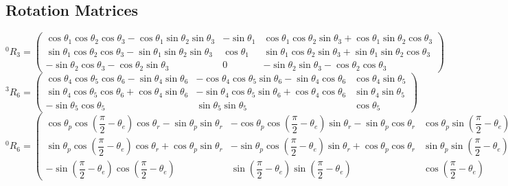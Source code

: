 \documentclass{article}
\begin{document}
\subsection{Rotation Matrices}
\bigskip
$
^{0}R_{3} = 
\begin{pmatrix}
	\cos\theta_{1} \cos\theta_{2} \cos\theta_{3} - \cos\theta_{1} \sin\theta_{2} \sin\theta_{3}
	& -\sin\theta_{1} &
	\cos\theta_{1} \cos\theta_{2} \sin\theta_{3} + \cos\theta_{1} \sin\theta_{2} \cos\theta_{3} \\
	\sin\theta_{1} \cos\theta_{2} \cos\theta_{3} - \sin\theta_{1} \sin\theta_{2} \sin\theta_{3}
	& \cos\theta_{1} &
	\sin\theta_{1} \cos\theta_{2} \sin\theta_{3} + \sin\theta_{1} \sin\theta_{2} \cos\theta_{3} \\
	- \sin\theta_{2} \cos\theta_{3} - \cos\theta_{2} \sin\theta_{3}
	& 0 &
	- \sin\theta_{2} \sin\theta_{3} - \cos\theta_{2} \cos\theta_{3}
\end{pmatrix}
$
\bigskip\\
$
^{3}R_{6} = 
\begin{pmatrix}
	\cos\theta_{4} \cos\theta_{5} \cos\theta_{6} - \sin\theta_{4} \sin\theta_{6} &
	- \cos\theta_{4} \cos\theta_{5} \sin\theta_{6} - \sin\theta_{4} \cos\theta_{6} &
	\cos\theta_{4} \sin\theta_{5} \\
	
	\sin\theta_{4} \cos\theta_{5} \cos\theta_{6} + \cos\theta_{4} \sin\theta_{6} &
	- \sin\theta_{4} \cos\theta_{5} \sin\theta_{6} + \cos\theta_{4} \cos\theta_{6} &
	\sin\theta_{4} \sin\theta_{5} \\
	
	- \sin\theta_{5} \cos\theta_{5} &
	\sin\theta_{5} \sin\theta_{5} &
	\cos\theta_{5}
\end{pmatrix}
$
\bigskip\\
$
^{0}R_{6} = 
\begin{pmatrix}
	\cos\theta_{p} \cos(\dfrac{\pi}{2} - \theta_{e}) \cos\theta_{r} - \sin\theta_{p} \sin\theta_{r} &
	- \cos\theta_{p} \cos(\dfrac{\pi}{2} - \theta_{e}) \sin\theta_{r} - \sin\theta_{p} \cos\theta_{r} &
	\cos\theta_{p} \sin(\dfrac{\pi}{2} - \theta_{e}) \\
	
	\sin\theta_{p} \cos(\dfrac{\pi}{2} - \theta_{e}) \cos\theta_{r} + \cos\theta_{p} \sin\theta_{r} &
	- \sin\theta_{p} \cos(\dfrac{\pi}{2} - \theta_{e}) \sin\theta_{r} + \cos\theta_{p} \cos\theta_{r} &
	\sin\theta_{p} \sin(\dfrac{\pi}{2} - \theta_{e}) \\
	
	- \sin(\dfrac{\pi}{2} - \theta_{e}) \cos(\dfrac{\pi}{2} - \theta_{e}) &
	\sin(\dfrac{\pi}{2} - \theta_{e}) \sin(\dfrac{\pi}{2} - \theta_{e}) &
	\cos(\dfrac{\pi}{2} - \theta_{e})
\end{pmatrix}
$
\end{document}
